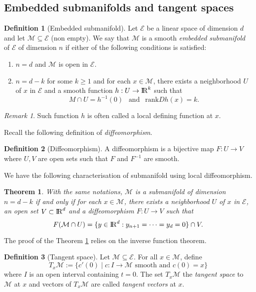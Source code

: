 \documentclass[10pt,a4paper]{book}
\theoremstyle{definition}
\newtheorem{defn}{Definition}[section]
\theoremstyle{plain}
\newtheorem{thm}{Theorem}[section]
\theoremstyle{remark}
\newtheorem{rmk}{Remark}[section]
\def\R{{\rm I\kern-0.16em R}}
\begin{document}
\subsection{Embedded submanifolds and tangent spaces}
\begin{defn}[Embedded submanifold]
Let $\mathcal{E}$ be a linear space of dimension $d$ and let $\mathcal{M}\subseteq \mathcal{E}$ (non empty). We say that $\mathcal{M}$ is a smooth \emph{embedded submanifold} of $\mathcal{E}$ of dimension $n$ if either of the following conditions is satisfied:
\begin{enumerate}
\item $n=d$ and $\mathcal{M}$ is open in $\mathcal{E}$.
\item $n=d-k$ for some $k\ge 1$ and for each $x\in \mathcal{M}$, there exists a neighborhood $U$ of $x$ in $\mathcal{E}$ and a smooth function $h:U \to \R^{k}$ such that
$$M\cap U=h^{-1}(0)~~\text{ and }~~\text{rank} Dh(x)=k.$$
\end{enumerate}
\end{defn}
\begin{rmk}
Such function $h$ is often called a local defining function at $x$.
\end{rmk}
Recall the following definition of \emph{diffeomorphism}.
\begin{defn}[Diffeomorphism]
A diffeomorphism is a bijective map $F:U \to V$ where $U,V$ are open sets such that $F$ and $F^{-1}$ are smooth.
\end{defn}
We have the following characterisation of submanifold using local diffeomorphism.
\begin{thm}\label{thm.embsubman}
With the same notations, $\mathcal{M}$ is a submanifold of dimension $n=d-k$ if and only if for each $x\in \mathcal{M}$, there exists a neighborhood $U$ of $x$ in $\mathcal{E}$, an open set $V\subset \R^d$ and a diffeomorphism $F:U \to V$ such that
$$F(\mathcal{M}\cap U)=\{y\in \R^d: y_{n+1}=\dots=y_d=0\}\cap V.$$
\end{thm}
The proof of the Theorem \ref{thm.embsubman} relies on the inverse function theorem.
\begin{defn}[Tangent space]
Let $\mathcal{M}\subseteq \mathcal{E}$. For all $x\in \mathcal{M}$, define
$$T_x\mathcal{M}:=\{c'(0) \mid c: I \to\mathcal{M} \text{ smooth and }c(0)=x\}$$
where $I$ is an open interval containing $t=0$.
The set $T_x\mathcal{M}$ the \emph{tangent space} to $\mathcal{M}$ at $x$ and vectors of $T_x\mathcal{M}$ are called \emph{tangent vectors} at $x$.
\end{defn}
\end{document}
